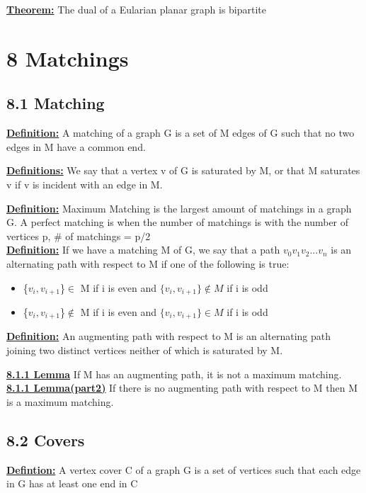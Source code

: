 \documentclass[12pt]{article}
\newcommand{\myt}[1]{\textbf{\underline{#1}}}
\begin{document}
	\myt{Theorem:} The dual of a Eularian planar graph is bipartite\\
	
	\section*{8 Matchings}
	\subsection*{8.1 Matching}
	
	\myt{Definition:} A matching of a graph G is a set of M edges of G such that no two edges in M have a common end.
	
	\myt{Definitions:} We say that a vertex v of G is saturated by M, or that M saturates v if v is incident with an edge in M.
	
	\myt{Definition:} Maximum Matching is the largest amount of matchings in a graph G. A perfect matching is when the number of matchings is with the number of vertices p, \# of matchings = p/2\\
	
	\myt{Definition:} If we have a matching M of G, we say that a path $v_0v_1v_2...v_n$ is an alternating path with respect to M if one of the following is true:\\
	\begin{itemize}
		\item \{$v_i,v_{i+1}$\}$\in$ M if i is even and $\{v_i,v_{i+1}\} \notin M$ if i is odd
		\item \{$v_i,v_{i+1}$\}$\notin$ M if i is even and $\{v_i,v_{i+1}\} \in M$ if i is odd
	\end{itemize}
	
	\myt{Definition:} An augmenting path with respect to M is an alternating path joining two distinct vertices neither of which is saturated by M.
	
	\myt{8.1.1 Lemma} If M has an augmenting path, it is not a maximum matching.\\
	
	\myt{8.1.1 Lemma(part2)} If there is no augmenting path with respect to M then M is a maximum matching.\\
	
	\subsection*{8.2 Covers}
	\myt{Defintion:} A vertex cover C of a graph G is a set of vertices such that each edge in G has at least one end in C\\
	
\end{document}
